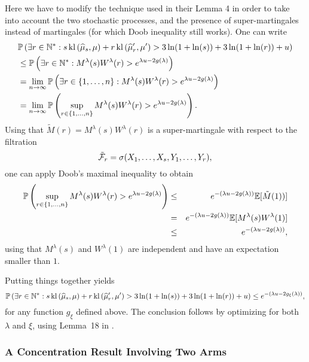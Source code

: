 Here we have to modify the technique used in their Lemma 4 in order to take into account the two stochastic processes, and the presence of super-martingales instead of martingales (for which Doob inequality still works).
One can write
%
\begin{align*}
    &\mathbb{P}\left(\exists r \in \mathbb{N}^* : s \, \mathrm{kl}\left(\widehat{\mu}_{s},\mu\right) + r \, \mathrm{kl}\left(\widehat{\mu}_r',\mu'\right) > 3\ln(1+\ln(s)) + 3\ln(1+\ln(r)) + u\right) \\
    & \leq \mathbb{P}\left(\exists r \in \mathbb{N}^* : M^\lambda(s)W^\lambda(r) > e^{\lambda u - 2g(\lambda)}\right) \\
    & = \lim_{n \rightarrow \infty} \mathbb{P}\left(\exists r \in \{1,\dots,n\} :  M^\lambda(s)W^\lambda(r) > e^{\lambda u - 2g(\lambda)}\right) \\
    & = \lim_{n \rightarrow \infty} \mathbb{P}\left(\sup_{r \in \{1,\dots,n\}}  M^\lambda(s)W^\lambda(r) > e^{\lambda u - 2g(\lambda)}\right).
\end{align*}
%
Using that $\tilde{M}(r) = M^\lambda(s)W^\lambda(r)$ is a super-martingale with respect to the filtration \[\tilde{\mathcal{F}}_r = \sigma(X_1,\dots,X_s, Y_1,\dots,Y_r),\] one can apply Doob's maximal inequality to obtain
\begin{eqnarray*}
    \mathbb{P}\left(\sup_{r \in \{1,\dots,n\}}  M^\lambda(s)W^\lambda(r) > e^{\lambda u - 2g(\lambda)}\right) &\leq& e^{-(\lambda u - 2g(\lambda))}\mathbb{E}[\tilde{M}(1))] \\
    & = & e^{-(\lambda u - 2g(\lambda))}\mathbb{E}[M^\lambda(s)W^\lambda(1)] \\
    & \leq & e^{-(\lambda u - 2g(\lambda))},
\end{eqnarray*}
using that $M^\lambda(s)$ and $W^\lambda(1)$ are independent and have an expectation smaller than $1$.

Putting things together yields
\[\mathbb{P}\left(\exists r \in \mathbb{N}^* : s \, \mathrm{kl}\left(\widehat{\mu}_{s},\mu\right) + r \, \mathrm{kl}\left(\widehat{\mu}_r',\mu'\right) > 3\ln(1+\ln(s)) + 3\ln(1+\ln(r)) + u\right) \leq e^{-\left(\lambda u - 2g_{\xi}(\lambda)\right)},\]
for any function $g_{\xi}$ defined above.
%
The conclusion follows by optimizing for both $\lambda$ and $\xi$, using Lemma~18 in \cite{KK18Martingales}.


\subsubsection{A Concentration Result Involving Two Arms}\label{proof:6:Chernoff2arms}

